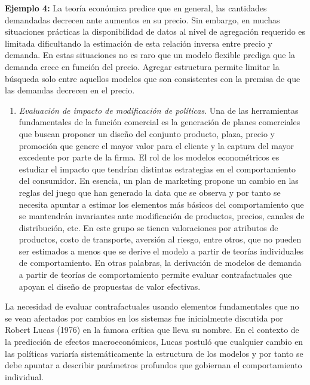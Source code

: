 \documentclass[
]{book}
\providecommand{\tightlist}{%
  \setlength{\itemsep}{0pt}\setlength{\parskip}{0pt}}
\begin{document}
\textbf{Ejemplo 4:} La teoría económica predice que en general, las cantidades demandadas decrecen ante aumentos en su precio. Sin embargo, en muchas situaciones prácticas la disponibilidad de datos al nivel de agregación requerido es limitada dificultando la estimación de esta relación inversa entre precio y demanda. En estas situaciones no es raro que un modelo flexible prediga que la demanda crece en función del precio. Agregar estructura permite limitar la búsqueda solo entre aquellos modelos que son consistentes con la premisa de que las demandas decrecen en el precio.

\begin{enumerate}
\def\labelenumi{\arabic{enumi}.}
\setcounter{enumi}{2}
\tightlist
\item
  \emph{Evaluación de impacto de modificación de políticas}. Una de las herramientas fundamentales de la función comercial es la generación de planes comerciales que buscan proponer un diseño del conjunto producto, plaza, precio y promoción que genere el mayor valor para el cliente y la captura del mayor excedente por parte de la firma. El rol de los modelos econométricos es estudiar el impacto que tendrían distintas estrategias en el comportamiento del consumidor. En esencia, un plan de marketing propone un cambio en las reglas del juego que han generado la data que se observa y por tanto se necesita apuntar a estimar los elementos más básicos del comportamiento que se mantendrán invariantes ante modificación de productos, precios, canales de distribución, etc. En este grupo se tienen valoraciones por atributos de productos, costo de transporte, aversión al riesgo, entre otros, que no pueden ser estimados a menos que se derive el modelo a partir de teorías individuales de comportamiento. En otras palabras, la derivación de modelos de demanda a partir de teorías de comportamiento permite evaluar contrafactuales que apoyan el diseño de propuestas de valor efectivas.
\end{enumerate}

La necesidad de evaluar contrafactuales usando elementos fundamentales que no se vean afectados por cambios en los sistemas fue inicialmente discutida por Robert Lucas (1976) en la famosa crítica que lleva su nombre. En el contexto de la predicción de efectos macroeconómicos, Lucas postuló que cualquier cambio en las políticas variaría sistemáticamente la estructura de los modelos y por tanto se debe apuntar a describir parámetros profundos que gobiernan el comportamiento individual.
\end{document}
